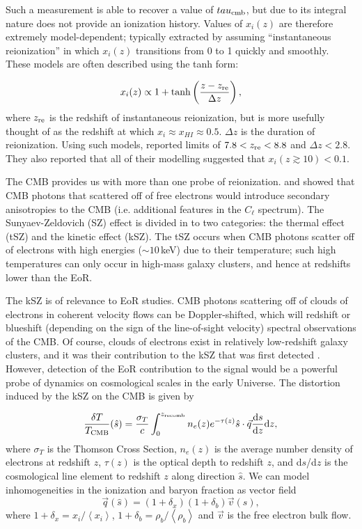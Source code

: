 Such a measurement is able to recover a value of $tau_{\rm cmb}$, but due to its integral nature does not provide an ionization history. Values of $x_i(z)$ are therefore extremely model-dependent; typically extracted by assuming ``instantaneous reionization'' in which $x_i(z)$ transitions from 0 to 1 quickly and smoothly. These models are often described using the tanh form:

\begin{equation}
x_i(z) \propto 1+\tanh\left(\frac{z - z_{\rm re}}{\Delta z}\right),
\end{equation}
where $z_{\rm re}$ is the redshift of instantaneous reionization, but is more usefully thought of as the redshift at which $x_i \approx x_{HI} \approx 0.5$. $\Delta z$ is the duration of reionization. Using such models, \cite{Planck.16.reionization} reported limits of  $7.8 < z_{\rm re} < 8.8$ and $\Delta z < 2.8$. They also reported that all of their modelling suggested that $x_i(z\gtrsim10)<0.1$.

The CMB provides us with more than one probe of reionization. \cite{Zeldovich.69} and \cite{Sunyaev.70} showed that CMB photons that scattered off of free electrons would introduce secondary anisotropies to the CMB (i.e. additional features in the $C_{\ell}$ spectrum). The Sunyaev-Zeldovich (SZ) effect is divided in to two categories: the thermal effect (tSZ) and the kinetic effect (kSZ). The tSZ occurs when CMB photons scatter off of electrons with high energies ($\sim 10$\,keV) due to their temperature; such high temperatures can only occur in high-mass galaxy clusters, and hence at redshifts lower than the EoR. 

The kSZ is of relevance to EoR studies. CMB photons scattering off of clouds of electrons in coherent velocity flows can be Doppler-shifted, which will redshift or blueshift (depending on the sign of the line-of-sight velocity) spectral observations of the CMB. Of course, clouds of electrons exist in relatively low-redshift galaxy clusters, and it was their contribution to the kSZ that was first detected \citep{Hand.12}. However, detection of the EoR contribution to the signal would be a powerful probe of dynamics on cosmological scales in the early Universe. The distortion induced by the kSZ on the CMB is given by

\begin{equation}
\frac{\delta T}{T_{\rm CMB}}(\hat{s}) = \frac{\sigma_T}{c} \int_0^{z_{\rm recomb}} n_e(z)e^{-\tau(z)} \hat{s}\cdot\vec{q} \frac{{\rm d}s}{{\rm d}z}{\rm d}z,
\label{eq:eor_intro_ksz}
\end{equation}
where $\sigma_T$ is the Thomson Cross Section, $n_e(z)$ is the average number density of electrons at redshift $z$, $\tau(z)$ is the optical depth to redshift $z$, and d$s$/d$z$ is the cosmological line element to redshift $z$ along direction $\hat{s}$. We can model inhomogeneities in the ionization and baryon fraction as vector field
\begin{equation}
\vec{q}(\hat{s}) = (1+\delta_x)(1+\delta_b)\vec{v}(\hat{s}),
\end{equation}
where $1+\delta_x = x_i/\left\langle x_i \right\rangle$, $1+\delta_b= \rho_b/\left\langle \rho_b \right\rangle$ and $\vec{v}$ is the free electron bulk flow.

